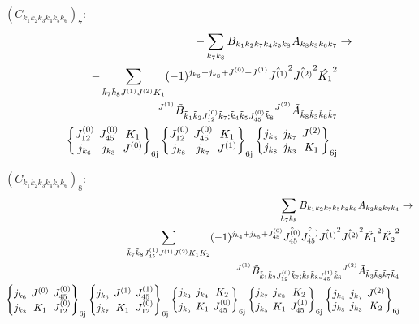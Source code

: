\documentclass[11pt]{article}
\newcommand{\sixj}[6]{\begingroup\setlength{\arraycolsep}{0.2em}\begin{Bmatrix} #1 & #2 & #3 \\ #4 & #5 & #6 \end{Bmatrix}_{\text{6j}}\endgroup}
\begin{document}
$\left({C}_{{k}_{1}{k}_{2}{k}_{3}{k}_{4}{k}_{5}{k}_{6}}\right)_{7}$:
\begin{align}
-\sum_{{k}_{7}{k}_{8}}{B}_{{k}_{1}{k}_{2}{k}_{7}{k}_{4}{k}_{5}{k}_{8}}{A}_{{k}_{8}{k}_{3}{k}_{6}{k}_{7}}&\rightarrow \notag \\-\sum_{\tilde{k}_{7}\tilde{k}_{8}J^{(1)}J^{(2)}K_{1}}(-1)^{j_{{k}_{6}} +j_{{k}_{8}} +J^{(0)} +J^{(1)} }\hat{J^{(1)}}^{2}\hat{J^{(2)}}^{2}\hat{K_{1}}^{2}& \notag \\{}^{J^{(1)}}\tilde{B}_{\tilde{k}_{1}\tilde{k}_{2}J^{(0)}_{12}\tilde{k}_{7};\tilde{k}_{4}\tilde{k}_{5}J^{(0)}_{45}\tilde{k}_{8}}{}^{J^{(2)}}\tilde{A}_{\tilde{k}_{8}\tilde{k}_{3}\tilde{k}_{6}\tilde{k}_{7}}& \notag \\\sixj{J^{(0)}_{12}}{J^{(0)}_{45}}{K_{1}}{j_{{k}_{6}}}{j_{{k}_{3}}}{J^{(0)}}\sixj{J^{(0)}_{12}}{J^{(0)}_{45}}{K_{1}}{j_{{k}_{8}}}{j_{{k}_{7}}}{J^{(1)}}\sixj{j_{{k}_{6}}}{j_{{k}_{7}}}{J^{(2)}}{j_{{k}_{8}}}{j_{{k}_{3}}}{K_{1}}
\end{align}

$\left({C}_{{k}_{1}{k}_{2}{k}_{3}{k}_{4}{k}_{5}{k}_{6}}\right)_{8}$:
\begin{align}
\sum_{{k}_{7}{k}_{8}}{B}_{{k}_{1}{k}_{2}{k}_{7}{k}_{5}{k}_{8}{k}_{6}}{A}_{{k}_{3}{k}_{8}{k}_{7}{k}_{4}}&\rightarrow \notag \\\sum_{\tilde{k}_{7}\tilde{k}_{8}J^{(1)}_{45}J^{(1)}J^{(2)}K_{1}K_{2}}(-1)^{j_{{k}_{4}} +j_{{k}_{5}} +J^{(0)}_{45} }\hat{J^{(0)}_{45}}\hat{J^{(1)}_{45}}\hat{J^{(1)}}^{2}\hat{J^{(2)}}^{2}\hat{K_{1}}^{2}\hat{K_{2}}^{2}& \notag \\{}^{J^{(1)}}\tilde{B}_{\tilde{k}_{1}\tilde{k}_{2}J^{(0)}_{12}\tilde{k}_{7};\tilde{k}_{5}\tilde{k}_{8}J^{(1)}_{45}\tilde{k}_{6}}{}^{J^{(2)}}\tilde{A}_{\tilde{k}_{3}\tilde{k}_{8}\tilde{k}_{7}\tilde{k}_{4}}& \notag \\\sixj{j_{{k}_{6}}}{J^{(0)}}{J^{(0)}_{45}}{j_{{k}_{3}}}{K_{1}}{J^{(0)}_{12}}\sixj{j_{{k}_{6}}}{J^{(1)}}{J^{(1)}_{45}}{j_{{k}_{7}}}{K_{1}}{J^{(0)}_{12}}\sixj{j_{{k}_{3}}}{j_{{k}_{4}}}{K_{2}}{j_{{k}_{5}}}{K_{1}}{J^{(0)}_{45}}\sixj{j_{{k}_{7}}}{j_{{k}_{8}}}{K_{2}}{j_{{k}_{5}}}{K_{1}}{J^{(1)}_{45}}\sixj{j_{{k}_{4}}}{j_{{k}_{7}}}{J^{(2)}}{j_{{k}_{8}}}{j_{{k}_{3}}}{K_{2}}
\end{align}
\end{document}
